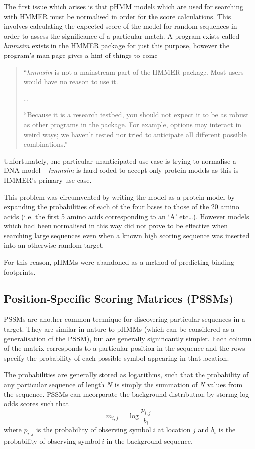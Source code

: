 The first issue which arises is that pHMM models which are used for searching
with HMMER must be normalised in order for the score calculations.
This involves calculating the expected score of the model for random sequences
in order to assess the significance of a particular match.
A program exists called \emph{hmmsim} exists in the HMMER package for just 
this purpose, however the program's man page gives a hint of things to come --
\begin{quotation}
  ``\emph{hmmsim} is not a mainstream part of the HMMER package. 
  Most users would have no reason to use it. 
  
  \ldots
  
  ``Because it is a research testbed, you should not expect it to be as robust 
  as other programs in the package. 
  For example, options may interact in weird ways; 
  we haven't tested nor tried to anticipate all different possible 
  combinations.''
\end{quotation}
Unfortunately, one particular unanticipated use case is trying to normalise a
DNA model -- \emph{hmmsim} is hard-coded to accept only protein models as this
is HMMER's primary use case.

This problem was circumvented by writing the model as a protein model by
expanding the probabilities of each of the four bases to those of the 20 
amino acids (i.e. the first 5 amino acids corresponding to an `A' etc\ldots).
However models which had been normalised in this way did not prove to be
effective when searching large sequences even when a known high scoring
sequence was inserted into an otherwise random target.

For this reason, pHMMs were abandoned as a method of predicting binding
footprints.


\subsection{Position-Specific Scoring Matrices (PSSMs)}
\label{sec:pssm_binding}

PSSMs are another common technique for discovering particular sequences in a
target.
They are similar in nature to pHMMs (which can be considered as a
generalisation of the PSSM), but are generally significantly simpler.
Each column of the matrix corresponds to a particular position in the sequence and
the rows specify the probability of each possible symbol appearing in that
location.

The probabilities are generally stored as logarithms, such that the probability
of any particular sequence of length $N$ is simply the summation of $N$ values
from the sequence.
PSSMs can incorporate the background distribution by storing log-odds scores
such that
\begin{equation*}
  m_{i,j} = \log {\frac{p_{i,j}}{b_i}}
\end{equation*}
where $p_{i,j}$ is the probability of observing symbol $i$ at location $j$ and
$b_i$ is the probability of observing symbol $i$ in the background sequence.

